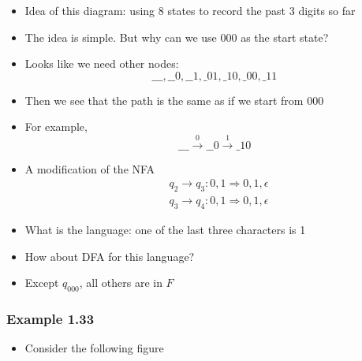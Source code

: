 \begin{frame}[allowframebreaks]
\begin{tikzpicture}
\end{tikzpicture}

\begin{itemize}
\item 
Idea of this diagram: using 8 states
to record the past 3 digits so far

\item The idea is simple. But 
why can we use 000 as the start state? 
\item Looks like we need other nodes:
  \begin{equation*}
    \_\_\_,
    \_\_0,
    \_\_1,
    \_01,
    \_10,
    \_00,
    \_11 
\end{equation*}
\item Then we see that the path is the same as if
  we start from  000
\item For example,
  \begin{equation*}
    \_\_\_ \xrightarrow{0}
    \_\_0 \xrightarrow{1}
    \_10
  \end{equation*}

\item A modification of the NFA 
  \begin{equation*}
    \begin{split}
& q_2 \rightarrow q_3:0,1 \Rightarrow 0,1,\epsilon\\
& q_3 \rightarrow q_4:0,1 \Rightarrow 0,1,\epsilon
\end{split}
\end{equation*}
\begin{center}
    \end{center}

  \item What is the language: one of the last three characters
    is 1
\item How about DFA for this language?

\item [] Except $q_{000}$, all others are in $F$
\end{itemize}\end{frame} \begin{frame}[allowframebreaks] \frametitle{Example 1.33}
\begin{itemize}
\item Consider the following figure
    \begin{center}
\end{center}
\end{itemize}
\end{frame}
